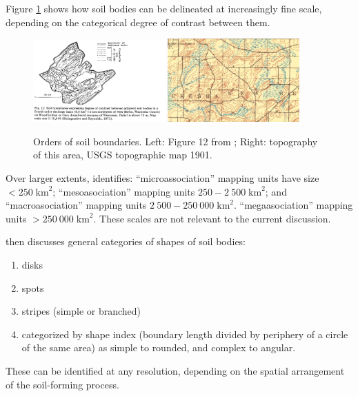 \documentclass[soil, manuscript]{copernicus}
\begin{document}
\par
Figure \ref{fig:hole12} shows how soil bodies can be delineated at increasingly fine scale, depending on the categorical degree of contrast between them.

\begin{figure}
  \centering
  \includegraphics[width=0.45\textwidth]{10.1016.0016-7061(78)90002-2_Fig12.png}
  \hfill
  \includegraphics[width=0.45\textwidth]{10.1016.0016-7061(78)90002-2_Fig12_topo1901.png}
  \caption{Orders of soil boundaries. Left: Figure 12 from \citep{holeApproachLandscapeAnalysis1978}; Right: topography of this area, USGS topographic map 1901.}
  \label{fig:hole12}
\end{figure}


\par
Over larger extents, \citet[Table 5]{holeApproachLandscapeAnalysis1978} identifies:
%
``microassociation'' mapping units have size $<250 \; \mathrm{km}^2$;
%
``mesoasociation'' mapping units $250-2~500 \; \mathrm{km}^2$; and
%
``macroasociation'' mapping units  $2~500 - 250~000 \;\mathrm{km}^2$.
%
``megaasociation'' mapping units  $> 250~000 \; \mathrm{km}^2$.
%
These scales are not relevant to the current discussion.

\par
\citet[Figure 5]{holeApproachLandscapeAnalysis1978}  then discusses general categories of shapes of soil bodies:
\begin{enumerate}
\item disks
\item spots
\item stripes (simple or branched)
\item categorized by shape index (boundary length divided by periphery of a circle of the same area) as simple to rounded, and complex to angular.
\end{enumerate}
%
These can be identified at any resolution, depending on the spatial arrangement of the soil-forming process.
\end{document}
